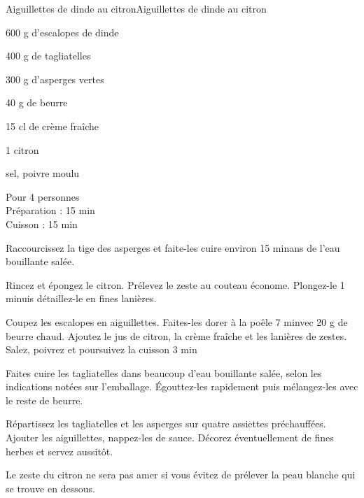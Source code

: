 \begin{recette}{Aiguillettes de dinde au citron}{Aiguillettes de dinde au citron}

\begin{ingredients}
600 g d’escalopes de dinde \par
400 g de tagliatelles\par
300 g d’asperges vertes \par
40 g de beurre\par
15 cl de crème fraîche\par
1 citron\par
sel, poivre moulu\par
\end{ingredients}

\begin{infos}
Pour 4 personnes\\
Préparation : 15 min\\
Cuisson : 15 min\\
\end{infos}

\begin{etapes}
\item Raccourcissez la tige des asperges et faite-les cuire environ 15 minans de l’eau bouillante salée.
\item Rincez et épongez le citron. Prélevez le zeste au couteau économe. Plongez-le 1 minuis détaillez-le en fines lanières.
\item Coupez les escalopes en aiguillettes. Faites-les dorer à la poêle 7 minvec 20 g de beurre chaud. Ajoutez le jus de citron, la crème fraîche et les lanières de zestes. Salez, poivrez et poursuivez la cuisson 3 min
\item Faites cuire les tagliatelles dans beaucoup d’eau bouillante salée, selon les indications notées sur l’emballage. Égouttez-les rapidement puis mélangez-les avec le reste de beurre.
\item Répartissez les tagliatelles et les asperges sur quatre assiettes préchauffées. Ajouter les aiguillettes, nappez-les de sauce. Décorez éventuellement de fines herbes et servez aussitôt.
\end{etapes}

\begin{conseils}
Le zeste du citron ne sera pas amer si vous évitez de prélever la peau blanche qui se trouve en dessous.
\end{conseils}

\end{recette}